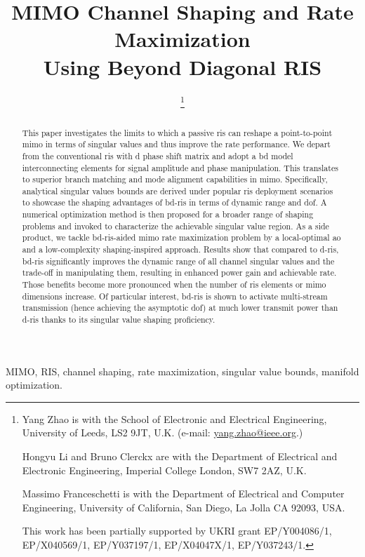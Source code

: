 \documentclass[journal]{IEEEtran}
\title{MIMO Channel Shaping and Rate Maximization\\Using Beyond Diagonal RIS}
\author{
	\IEEEauthorblockN{
		Yang Zhao, \IEEEmembership{Member, IEEE,}
		Hongyu Li, \IEEEmembership{Graduate Student Member, IEEE,}\\
		Massimo Franceschetti, \IEEEmembership{Fellow, IEEE,}
		and Bruno Clerckx, \IEEEmembership{Fellow, IEEE}
	}
	\thanks{
		Yang Zhao is with the School of Electronic and Electrical Engineering, University of Leeds, LS2 9JT, U.K. (e-mail: \href{mailto:yang.zhao@ieee.org}{yang.zhao@ieee.org}.)

		Hongyu Li and Bruno Clerckx are with the Department of Electrical and Electronic Engineering, Imperial College London, SW7 2AZ, U.K.

		Massimo Franceschetti is with the Department of Electrical and Computer Engineering, University of California, San Diego, La Jolla CA 92093, USA.

		This work has been partially supported by UKRI grant EP/Y004086/1, EP/X040569/1, EP/Y037197/1, EP/X04047X/1, EP/Y037243/1.
	}
}
\begin{document}
\maketitle

\begin{abstract}
	This paper investigates the limits to which a passive \gls{ris} can reshape a point-to-point \gls{mimo} in terms of singular values
	and thus improve the rate performance.
	We depart from the conventional \gls{ris} with \gls{d} phase shift matrix and adopt a \gls{bd} model interconnecting elements for signal amplitude and phase manipulation.
	This translates to superior branch matching and mode alignment capabilities in \gls{mimo}.
	Specifically, analytical singular values bounds are derived under popular \gls{ris} deployment scenarios
	to showcase the shaping advantages of \gls{bd}-\gls{ris} in terms of dynamic range and \gls{dof}.
	A numerical optimization method is then proposed for a broader range of shaping problems and invoked to characterize the achievable singular value region.
	As a side product, we tackle \gls{bd}-\gls{ris}-aided \gls{mimo} rate maximization problem by a local-optimal \gls{ao} and a low-complexity shaping-inspired approach.
	Results show that compared to \gls{d}-\gls{ris}, \gls{bd}-\gls{ris} significantly improves the dynamic range of all channel singular values and the trade-off in manipulating them, resulting in enhanced power gain and achievable rate.
	Those benefits become more pronounced when the number of \gls{ris} elements or \gls{mimo} dimensions increase.
	Of particular interest, \gls{bd}-\gls{ris} is shown to activate multi-stream transmission (hence achieving the asymptotic \gls{dof}) at much lower transmit power than \gls{d}-\gls{ris} thanks to its singular value shaping proficiency.
\end{abstract}

\begin{IEEEkeywords}
	MIMO, RIS, channel shaping, rate maximization, singular value bounds, manifold optimization.
\end{IEEEkeywords}

\glsresetall
\end{document}
